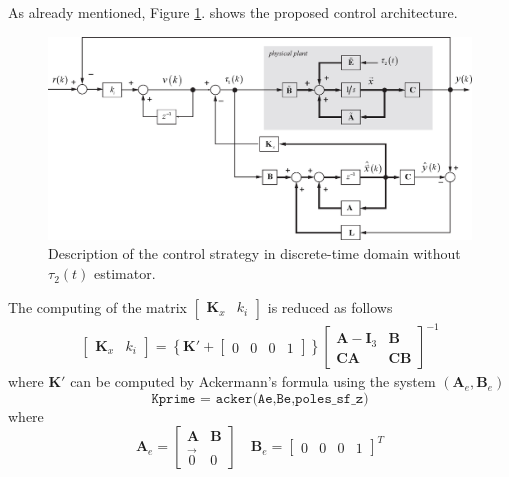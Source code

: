 \documentclass[11pt,a4paper,oneside]{book}
\numberwithin{equation}{section}
\theoremstyle{it}
\theoremstyle{definition}
\begin{document}
\vspace{5mm}
As already mentioned,  Figure \ref{figure_ctrl1}. shows the proposed control architecture.
\begin{figure}[H]
	\centering
	\includegraphics[width = 460pt, angle = 0, 
	keepaspectratio]{figures/msm/servo_msm_2.eps}
	\captionsetup{width=0.5\textwidth, font=small}
	\caption{Description of the control strategy in discrete-time domain 
		without $\tau_2(t)$ estimator.}
	\label{figure_ctrl1}
\end{figure}
\noindent The computing  of the matrix $\begin{bmatrix}
	\mathbf{K}_x & k_i
\end{bmatrix}$ is reduced as follows
\begin{equation}
	\begin{aligned}
		\begin{bmatrix} 
			\mathbf{K}_x & k_i
		\end{bmatrix} = \left\lbrace \mathbf{K'}+
		\begin{bmatrix} 
			0&0&0&1
		\end{bmatrix}\right\rbrace 
		\begin{bmatrix} 
			\mathbf{A}-\mathbf{I}_3 & \mathbf{B}  \\[6pt] 
			\mathbf{C}\mathbf{A} & \mathbf{C}\mathbf{B} 
		\end{bmatrix}^{-1}
	\end{aligned}
\end{equation}
where $\mathbf{K'}$ can be computed by Ackermann's formula using the system 
$(\mathbf{A}_e,\mathbf{B}_e)$
\begin{equation}
	\texttt{Kprime = acker(Ae,Be,poles\_sf\_z)}
\end{equation}
where
\begin{equation}
	\mathbf{A}_e = \begin{bmatrix} \mathbf{A} & \mathbf{B} \\[6pt] \vec{0}  &  0
	\end{bmatrix} \quad 
	\mathbf{B}_e = \begin{bmatrix} 0&0&0&1\end{bmatrix}^T
\end{equation}
\end{document}
